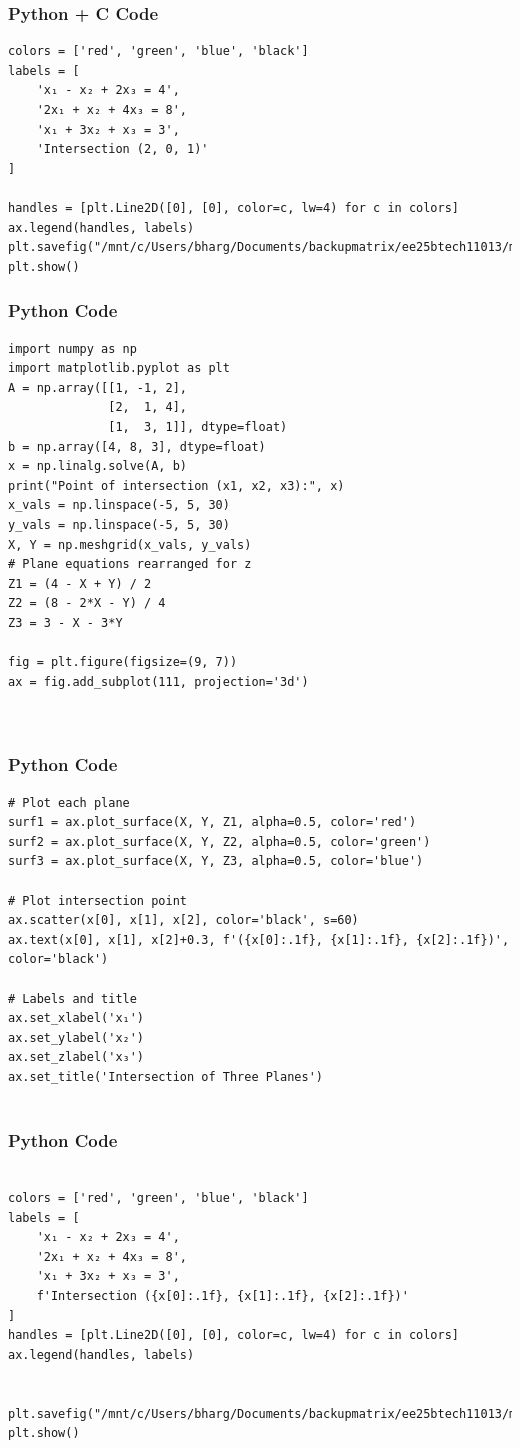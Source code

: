 \documentclass{beamer}
\begin{document}
\begin{frame}[fragile]
    \frametitle{Python + C Code}
    \begin{lstlisting}
colors = ['red', 'green', 'blue', 'black']
labels = [
    'x₁ - x₂ + 2x₃ = 4',
    '2x₁ + x₂ + 4x₃ = 8',
    'x₁ + 3x₂ + x₃ = 3',
    'Intersection (2, 0, 1)'
]

handles = [plt.Line2D([0], [0], color=c, lw=4) for c in colors]
ax.legend(handles, labels)
plt.savefig("/mnt/c/Users/bharg/Documents/backupmatrix/ee25btech11013/matgeo/12.235/figs/Figure_1.png")
plt.show()

    \end{lstlisting}
\end{frame}

\begin{frame}[fragile]
    \frametitle{Python Code}
    \begin{lstlisting}
import numpy as np
import matplotlib.pyplot as plt
A = np.array([[1, -1, 2],
              [2,  1, 4],
              [1,  3, 1]], dtype=float)
b = np.array([4, 8, 3], dtype=float)
x = np.linalg.solve(A, b)
print("Point of intersection (x1, x2, x3):", x)
x_vals = np.linspace(-5, 5, 30)
y_vals = np.linspace(-5, 5, 30)
X, Y = np.meshgrid(x_vals, y_vals)
# Plane equations rearranged for z
Z1 = (4 - X + Y) / 2
Z2 = (8 - 2*X - Y) / 4
Z3 = 3 - X - 3*Y

fig = plt.figure(figsize=(9, 7))
ax = fig.add_subplot(111, projection='3d')



    \end{lstlisting}
\end{frame}
\begin{frame}[fragile]
    \frametitle{Python Code}
    \begin{lstlisting}
# Plot each plane
surf1 = ax.plot_surface(X, Y, Z1, alpha=0.5, color='red')
surf2 = ax.plot_surface(X, Y, Z2, alpha=0.5, color='green')
surf3 = ax.plot_surface(X, Y, Z3, alpha=0.5, color='blue')

# Plot intersection point
ax.scatter(x[0], x[1], x[2], color='black', s=60)
ax.text(x[0], x[1], x[2]+0.3, f'({x[0]:.1f}, {x[1]:.1f}, {x[2]:.1f})', color='black')

# Labels and title
ax.set_xlabel('x₁')
ax.set_ylabel('x₂')
ax.set_zlabel('x₃')
ax.set_title('Intersection of Three Planes')


    \end{lstlisting}
\end{frame}
\begin{frame}[fragile]
    \frametitle{Python Code}
    \begin{lstlisting}

colors = ['red', 'green', 'blue', 'black']
labels = [
    'x₁ - x₂ + 2x₃ = 4',
    '2x₁ + x₂ + 4x₃ = 8',
    'x₁ + 3x₂ + x₃ = 3',
    f'Intersection ({x[0]:.1f}, {x[1]:.1f}, {x[2]:.1f})'
]
handles = [plt.Line2D([0], [0], color=c, lw=4) for c in colors]
ax.legend(handles, labels)


plt.savefig("/mnt/c/Users/bharg/Documents/backupmatrix/ee25btech11013/matgeo/12.235/figs/Figure_1.png")
plt.show()

    \end{lstlisting}
\end{frame}
\end{document}
